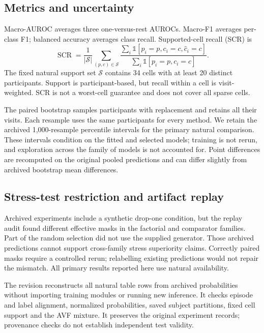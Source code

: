 \subsection{Metrics and uncertainty}
Macro-AUROC averages three one-versus-rest AUROCs. Macro-F1 averages per-class F1; balanced accuracy averages class recall. Supported-cell recall (SCR) is
\begin{equation}
\operatorname{SCR}=\frac{1}{|\mathcal S|}\sum_{(p,c)\in\mathcal S}
\frac{\sum_i\mathbb 1[p_i=p,c_i=c,\hat c_i=c]}{\sum_i\mathbb 1[p_i=p,c_i=c]}.
\end{equation}
The fixed natural support set $\mathcal S$ contains 34 cells with at least 20 distinct participants. Support is participant-based, but recall within a cell is visit-weighted. SCR is not a worst-cell guarantee and does not cover all sparse cells.

The paired bootstrap samples participants with replacement and retains all their visits. Each resample uses the same participants for every method. We retain the archived 1,000-resample percentile intervals for the primary natural comparison. These intervals condition on the fitted and selected models; training is not rerun, and exploration across the family of models is not accounted for. Point differences are recomputed on the original pooled predictions and can differ slightly from archived bootstrap mean differences.

\subsection{Stress-test restriction and artifact replay}
Archived experiments include a synthetic drop-one condition, but the replay audit found different effective masks in the factorial and comparator families. Part of the random selection did not use the supplied generator. Those archived predictions cannot support cross-family stress superiority claims. Correctly paired masks require a controlled rerun; relabelling existing predictions would not repair the mismatch. All primary results reported here use natural availability.

The revision reconstructs all natural table rows from archived probabilities without importing training modules or running new inference. It checks episode and label alignment, normalized probabilities, saved subject partitions, fixed cell support and the AVF mixture. It preserves the original experiment records; provenance checks do not establish independent test validity.
